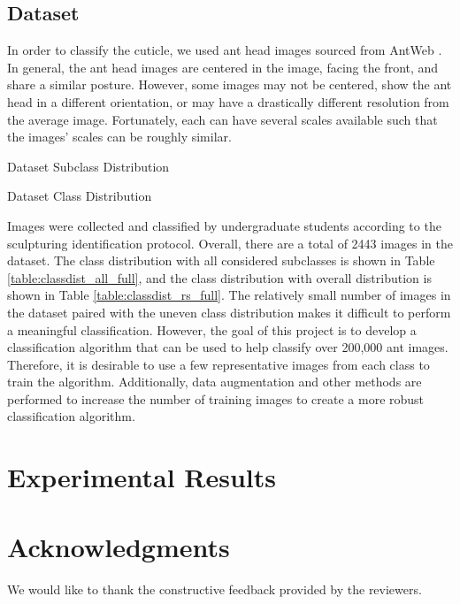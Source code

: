 \documentclass{aci}
\begin{document}
\subsection{Dataset}
In order to classify the cuticle, we used ant head images sourced from AntWeb
\cite{antweb}. In general, the ant head images are centered in the image, facing
the front, and share a similar posture. However, some images may not be
centered, show the ant head in a different orientation, or may have a
drastically different resolution from the average image. Fortunately, each can
have several scales available such that the images' scales can be roughly
similar.

\begin{table}[h]
  \centering
  \caption{Dataset Subclass Distribution}
  \label{table:classdist_all_full}
  
\end{table}

\begin{table}[h]
  \centering
  \caption{Dataset Class Distribution}
  \label{table:classdist_rs_full}
  
\end{table}

Images were collected and classified by undergraduate students according to the
sculpturing identification protocol. Overall, there are a total of 2443 images
in the dataset. The class distribution with all considered subclasses is shown
in Table \ref{table:classdist_all_full}, and the class distribution with overall
distribution is shown in Table \ref{table:classdist_rs_full}. The relatively
small number of images in the dataset paired with the uneven class distribution
makes it difficult to perform a meaningful classification. However, the goal of
this project is to develop a classification algorithm that can be used to help
classify over 200,000 ant images. Therefore, it is desirable to use a few
representative images from each class to train the algorithm. Additionally, data
augmentation and other methods are performed to increase the number of training
images to create a more robust classification algorithm.

\section{Experimental Results}



\section*{Acknowledgments}
We would like to thank the constructive feedback provided by the reviewers.



\end{document}
